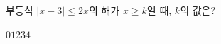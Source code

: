 부등식 $|x-3|\le 2x$의 해가 $x\ge k$일 때, $k$의 값은?
\begin{choices32}{$0$}{$1$}{$2$}{$3$}{$4$}\end{choices32}
